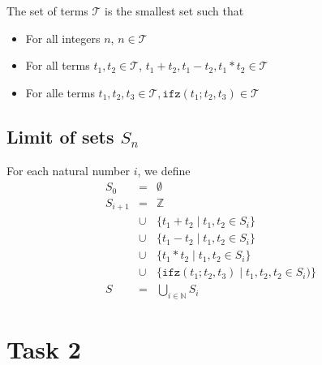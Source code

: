 \documentclass{article}
\begin{document}
The set of terms $\mathcal{T}$ is the smallest set such that 

\begin{itemize}
\item For all integers $n$, $n\in\mathcal{T}$
\item For all terms $t_1,t_2\in\mathcal{T}$, $t_1 + t_2, t_1 - t_2, t_1 * t_2 \in \mathcal{T}$
\item For alle terms $t_1,t_2,t_3\in\mathcal{T}, \mathtt{ifz}(t_1;t_2,t_3)\in \mathcal{T}$
\end{itemize}

\subsection*{Limit of sets $S_n$}

For each natural number $i$, we define
\begin{align*}
S_0 & = & \emptyset \\
S_{i+1} & = & \mathbb{Z} \\
  & \cup & \{ t_1 + t_2 \mid t_1,t_2 \in S_i\}\\
  & \cup & \{ t_1 - t_2 \mid t_1, t_2 \in S_i \}\\
  & \cup & \{ t_1 * t_2 \mid t_1,t_2\in S_i\} \\
  & \cup & \{ \mathtt{ifz}(t_1;t_2,t_3) \mid t_1,t_2,t_2 \in S_i)\}\\
S & = & \bigcup_{i\in\mathbb{N}} S_i
\end{align*}
\section*{Task 2}
\end{document}
